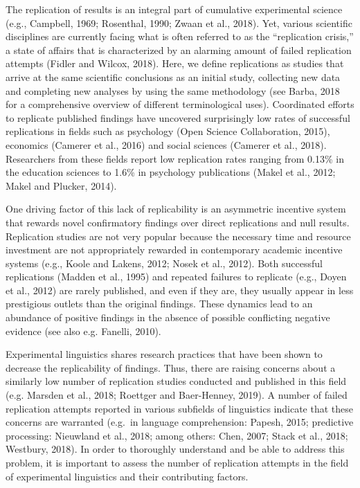 \documentclass[]{elsarticle} %
\begin{document}
The replication of results is an integral part of cumulative
experimental science (e.g., Campbell, 1969; Rosenthal, 1990; Zwaan et
al., 2018). Yet, various scientific disciplines are currently facing
what is often referred to as the ``replication crisis,'' a state of
affairs that is characterized by an alarming amount of failed
replication attempts (Fidler and Wilcox, 2018). Here, we define
replications as studies that arrive at the same scientific conclusions
as an initial study, collecting new data and completing new analyses by
using the same methodology (see Barba, 2018 for a comprehensive overview
of different terminological uses). Coordinated efforts to replicate
published findings have uncovered surprisingly low rates of successful
replications in fields such as psychology (Open Science Collaboration,
2015), economics (Camerer et al., 2016) and social sciences (Camerer et
al., 2018). Researchers from these fields report low replication rates
ranging from 0.13\% in the education sciences to 1.6\% in psychology
publications (Makel et al., 2012; Makel and Plucker, 2014).

One driving factor of this lack of replicability is an asymmetric
incentive system that rewards novel confirmatory findings over direct
replications and null results. Replication studies are not very popular
because the necessary time and resource investment are not appropriately
rewarded in contemporary academic incentive systems (e.g., Koole and
Lakens, 2012; Nosek et al., 2012). Both successful replications (Madden
et al., 1995) and repeated failures to replicate (e.g., Doyen et al.,
2012) are rarely published, and even if they are, they usually appear in
less prestigious outlets than the original findings. These dynamics lead
to an abundance of positive findings in the absence of possible
conflicting negative evidence (see also e.g. Fanelli, 2010).

Experimental linguistics shares research practices that have been shown
to decrease the replicability of findings. Thus, there are raising
concerns about a similarly low number of replication studies conducted
and published in this field (e.g. Marsden et al., 2018; Roettger and
Baer-Henney, 2019). A number of failed replication attempts reported in
various subfields of linguistics indicate that these concerns are
warranted (e.g.~in language comprehension: Papesh, 2015; predictive
processing: Nieuwland et al., 2018; among others: Chen, 2007; Stack et
al., 2018; Westbury, 2018). In order to thoroughly understand and be
able to address this problem, it is important to assess the number of
replication attempts in the field of experimental linguistics and their
contributing factors.
\end{document}
